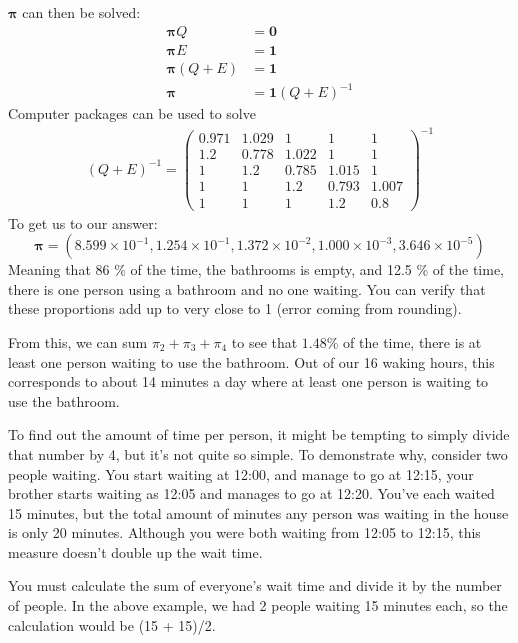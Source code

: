 $\boldsymbol{\pi}$ can then be solved:
\begin{align*}
	 \boldsymbol{\pi}Q &= \mathbf{0}\\
	 \boldsymbol{\pi} E &= \mathbf{1}\\
	 \boldsymbol{\pi} (Q + E) &= \mathbf{1}\\
	 \boldsymbol{\pi} & =  \mathbf{1}(Q+E)^{-1}
\end{align*}
Computer packages can be used to solve
\begin{align*}
	(Q+E)^{-1} = \begin{pmatrix}
	0.971	&	1.029	&	1 		& 1 		& 1	\\
	1.2  	&	0.778	& 1.022 	& 1 		& 1	\\
	1  		&	1.2		&0.785		&1.015 		& 1	\\
	1  		&	1		&	1.2 	&0.793		& 1.007\\
	1		&	1		&	1		& 1.2 		& 0.8
	\end{pmatrix}^{-1}
\end{align*}
To get us to our answer:
$$ \boldsymbol{\pi} = ( 8.599\times 10^{-1}, 1.254\times 10^{-1}, 1.372\times 10^{-2}, 1.000\times 10^{-3}, 3.646\times 10^{-5}) $$
Meaning that 86 \% of the time, the bathrooms is empty, and 12.5 \% of the time, there is one person using a bathroom and no one waiting. You can verify that these proportions add up to very close to 1 (error coming from rounding).

From this, we can sum $\pi_2 + \pi_3 + \pi_4$ to see that $1.48\%$ of the time, there is at least one person waiting to use the bathroom. Out of our 16 waking hours, this corresponds to about 14 minutes a day where at least one person is waiting to use the bathroom.

To find out the amount of time per person, it might be tempting to simply divide that number by 4, but it's not quite so simple. To demonstrate why, consider two people waiting. You start waiting at 12:00, and manage to go at 12:15, your brother starts waiting as 12:05 and manages to go at 12:20. You've each waited 15 minutes, but the total amount of minutes any person was waiting in the house is only 20 minutes. Although you were both waiting from 12:05 to 12:15, this measure doesn't double up the wait time.

You must calculate the sum of everyone's wait time and divide it by the number of people. In the above example, we had 2 people waiting 15 minutes each, so the calculation would be (15 + 15)/2.
\\

